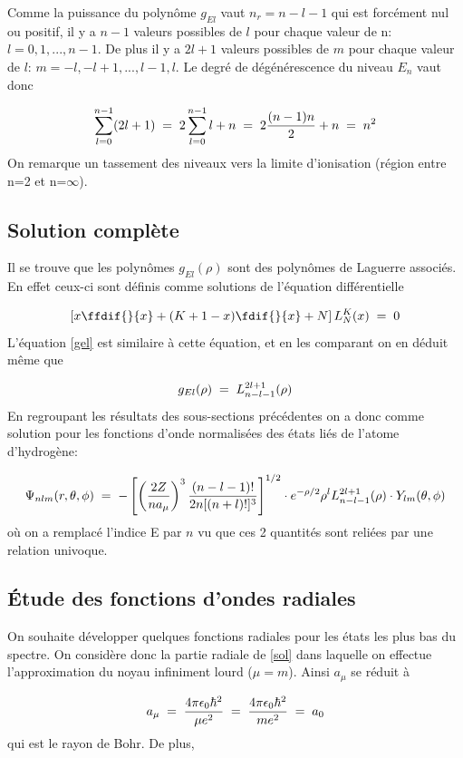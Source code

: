 Comme la puissance du polynôme $g_{El}$ vaut $n_r=n-l-1$ qui est forcément nul ou positif, il y a $n-1$ valeurs possibles de $l$ pour chaque valeur de n: $l=0, 1, ..., n-1$. De plus il y a $2l+1$ valeurs possibles de $m$ pour chaque valeur de $l$: $m=-l, -l+1, ..., l-1, l$. Le degré de dégénérescence du niveau $E_n$ vaut donc

\[
    \sum_{l=0}^{n-1} (2l+1)\; = \; 2\sum_{l=0}^{n-1} l + n \; = \;  2 \dfrac{(n-1)n}{2} + n \; = \;  n^2
\]
On remarque un tassement des niveaux vers la limite d'ionisation (région entre n=2 et n=$\infty$).

\subsection{Solution complète}
Il se trouve que les polynômes $g_{El}(\rho)$ sont des polynômes de Laguerre associés. En effet ceux-ci sont définis comme solutions de l'équation différentielle

\begin{equation}
    \left[x\ffdif{}{x}+(K+1-x)\fdif{}{x}+N\right] L_{N}^{K}(x)\eq 0
\end{equation}
L'équation \eqref{gel} est similaire à cette équation, et en les comparant on en déduit même que

\[
    g_{El}(\rho)\; = \; L_{n-l-1}^{2l+1}(\rho)
\]
En regroupant les résultats des sous-sections précédentes on a donc comme solution pour les fonctions d'onde normalisées des états liés de l'atome d'hydrogène:

\begin{equation}
    \Psi_{nlm}(r,\theta,\phi)
    \; = \;
    -\left[\left(\dfrac{2Z}{na_{\mu}}\right)^3\dfrac{(n-l-1)!}{2n[(n+l)!]^3}\right]^{1/2} \cdot e^{-\rho/2}\rho^l L_{n-l-1}^{2l+1}(\rho) \cdot Y_{lm}(\theta,\phi)
    \label{sol}
\end{equation}
où on a remplacé l'indice E par $n$ vu que ces 2 quantités sont reliées par une relation univoque.


\subsection{Étude des fonctions d'ondes radiales}
On souhaite développer quelques fonctions radiales pour les états les plus bas du spectre. On considère donc la partie radiale de \eqref{sol} dans laquelle on effectue l'approximation du noyau infiniment lourd ($\mu=m$). Ainsi $a_\mu$ se réduit à

\[
    a_{\mu}\; = \; \dfrac{4\pi\epsilon_0\hbar^2}{\mu e^2}\; = \; \dfrac{4\pi\epsilon_0\hbar^2}{me^2}\; = \;  a_0
\]
qui est le rayon de Bohr. De plus,

